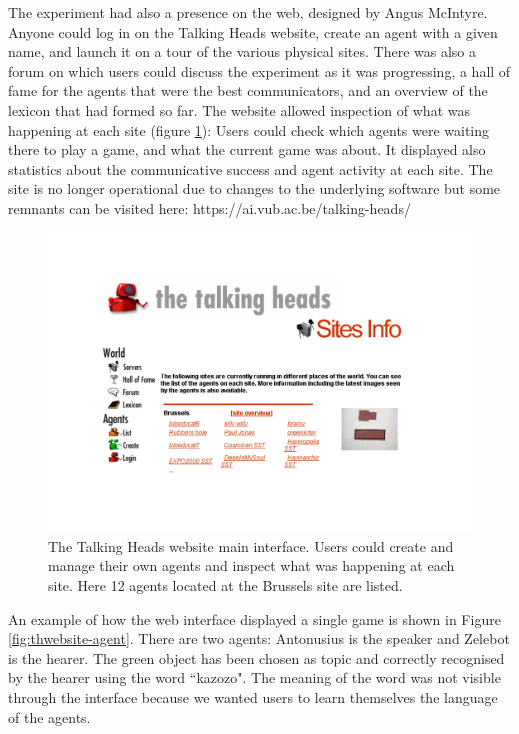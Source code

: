 The experiment had also a presence on the web, designed by Angus McIntyre. Anyone could log in on the 
Talking Heads website, create an agent with 
a given name, and launch it on a tour of the various physical sites. There was also a forum on which users could discuss
the experiment as it was progressing, a hall of fame for the agents that were the best communicators, and 
an overview of the lexicon 
that had formed so far. The website allowed inspection of what was happening at each site (figure \ref{fig:thwebsite}): 
Users could check which agents were waiting there to play a game, and what the current 
game was about. It displayed also statistics about the 
communicative success and agent activity at each site. The site is no longer operational due to 
changes to the underlying software but some remnants can be visited here: https://ai.vub.ac.be/talking-heads/
\begin{figure}[htbp]
  \centerline{\includegraphics[width=.85\textwidth]{chap8/figures/th-website}}
\caption{\footnotesize\label{fig:thwebsite} 
The Talking Heads website main interface. Users could create and manage their own agents and inspect what was happening 
at each site. Here 12 agents located at the Brussels site are listed.}
\end{figure}

An example of how the web interface displayed a single game is shown in Figure \ref{fig:thwebsite-agent}. 
There are two agents: Antonusius is the speaker and Zelebot is the hearer. 
The green object has been chosen as topic and correctly 
recognised by the hearer using the word ``kazozo". The meaning of the word was not visible through the interface because we 
wanted users to learn themselves the language of the agents. 

